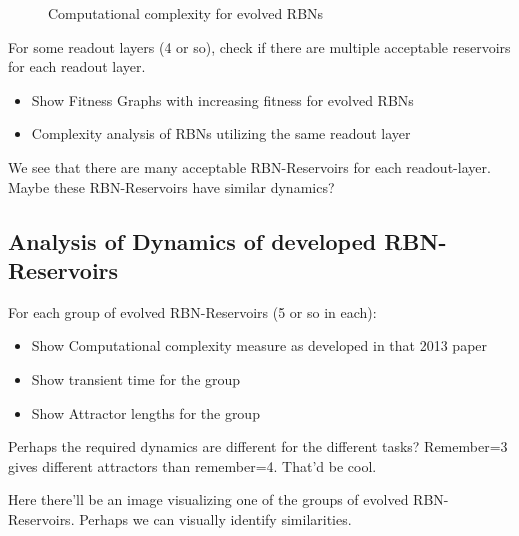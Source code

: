 \begin{figure}
  \centering
  \caption{Computational complexity for evolved RBNs}
\end{figure}

For some readout layers (4 or so), check if there are multiple acceptable reservoirs for each readout layer.

\begin{itemize}
  \item Show Fitness Graphs with increasing fitness for evolved RBNs
  \item Complexity analysis of RBNs utilizing the same readout layer
\end{itemize}

We see that there are many acceptable RBN-Reservoirs for each readout-layer.
Maybe these RBN-Reservoirs have similar dynamics?


\subsection{Analysis of Dynamics of developed RBN-Reservoirs}

For each group of evolved RBN-Reservoirs (5 or so in each):

\begin{itemize}
  \item Show Computational complexity measure as developed in that 2013 paper
  \item Show transient time for the group
  \item Show Attractor lengths for the group
\end{itemize}


Perhaps the required dynamics are different for the different tasks?
Remember=3 gives different attractors than remember=4. That'd be cool.


Here there'll be an image visualizing one of the groups of evolved RBN-Reservoirs.
Perhaps we can visually identify similarities.
